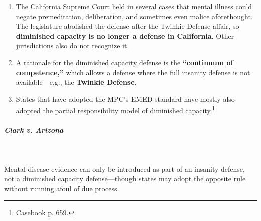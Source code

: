 \begin{enumerate}
\begin{enumerate}
\begin{enumerate}
            specific intent crimes.
        \end{enumerate}
        \item \textbf{EMED in manslaughter} (a variant of the common law 
        partial responsibility test), \S\ 210.3(1)(b): ``Homicide constitutes 
        manslaughter when: (b) a homicide that would otherwise be murder is 
        committed under the influence of extreme mental or emotional 
        disturbance for which there is a reasonable explanation or excuse.''
        \item Both allow capital cases to be mitigated to imprisonment.
    \end{enumerate}
    \item The California Supreme Court held in several cases that mental 
    illness could negate premeditation, deliberation, and sometimes even 
    malice aforethought. The legislature abolished the defense after the 
    Twinkie Defense affair, so \textbf{diminished capacity is no longer a 
    defense in California}. Other jurisdictions also do not recognize it.
    \item A rationale for the diminished capacity defense is the 
    \textbf{``continuum of competence,''} which allows a defense where the 
    full insanity defense is not available---e.g., the \textbf{Twinkie 
    Defense}.
    \item States that have adopted the MPC's EMED standard have mostly also 
    adopted the partial responsibility model of diminished 
    capacity.\footnote{Casebook p. 659.}
\end{enumerate}

\paragraph{\emph{Clark v. Arizona}}
~\\\\
Mental-disease evidence can only be introduced as part of an insanity defense, 
not a diminished capacity defense---though states may adopt the opposite rule 
without running afoul of due process.

